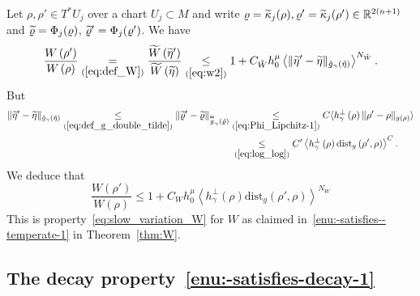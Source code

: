 \documentclass[10pt]{amsart}
\theoremstyle{definition}\newtheorem{defi}[theo]{Definition}\newtheorem{rema}[theo]{Remark}\newtheorem{exam}[theo]{Example}\newtheorem{exem}[theo]{Example}\newtheorem{nota}[theo]{Notation}
\newcommand*\eq[1]{\underset{(#1)}{=}}
\newcommand*\ineq[1]{\underset{(#1)}{\leq}}
\newcommand{\dist}{\mathrm{dist}}
\newcommand{\bbR}{\mathbb{R}}
\let\oldtilde\tilde
\renewcommand*{\tilde}[1]{\mathchoice{\widetilde{#1}}{\widetilde{#1}}{\oldtilde{#1}}{\oldtilde{#1}}}
\begin{document}
Let $\rho,\rho'\in T^{*}U_{j}$ over a chart $U_{j}\subset M$ and write $\varrho=\tilde{\kappa}_{j}(\rho),\varrho'=\tilde{\kappa}_{j}(\rho')\in\bbR^{2(n+1)}$ and $\tilde{\varrho}=\Phi_{j}(\varrho)$, $\tilde{\varrho}'=\Phi_{j}(\varrho')$. We have
\[
\frac{W\left(\rho'\right)}{W\left(\rho\right)}\eq{\ref{eq:def_W}}\frac{\tilde{W}\left(\tilde{\eta}'\right)}{\tilde{W}\left(\tilde{\eta}\right)}\ineq{\ref{eq:w2}}1+C_{\tilde{W}}h_{0}^{\mu}\left\langle\|\tilde{\eta}'-\tilde{\eta}\|_{\tilde{g}_{\gamma}\left(\tilde{\eta}\right)}\right\rangle^{N_{\tilde{W}}}.
\]
But
\begin{align*}
\|\tilde{\eta}'-\tilde{\eta}\|_{\tilde{g}_{\gamma}\left(\tilde{\eta}\right)}\ineq{\ref{eq:def_g_double_tilde}}\|\tilde{\varrho}'-\tilde{\varrho}\|_{\overset{\thickapprox}{g}_{\gamma}\left(\tilde{\varrho}\right)}&\ineq{\ref{eq:Phi_Lipchitz-1}}C\langle h_{\gamma}^{\perp}\left(\rho\right)\|\rho'-\rho\|_{g\left(\rho\right)}\rangle \\
& \:\ineq{\ref{eq:log_log}}C'\left\langle h_{\gamma}^{\perp}\left(\rho\right)\dist_{g}\left(\rho',\rho\right)\right\rangle ^{C}.
\end{align*}
We deduce that
\[
\frac{W\left(\rho'\right)}{W\left(\rho\right)}\leq1+C_{W}h_{0}^{\mu}\left\langle h_{\gamma}^{\perp}\left(\rho\right)\dist_{g}\left(\rho',\rho\right)\right\rangle ^{N_{W}}
\]
This is property~\eqref{eq:slow_variation_W} for $W$ as claimed in~\eqref{enu:-satisfies--temperate-1} in Theorem~\ref{thm:W}.

\subsection{The decay property~\eqref{enu:-satisfies-decay-1}}
\end{document}

